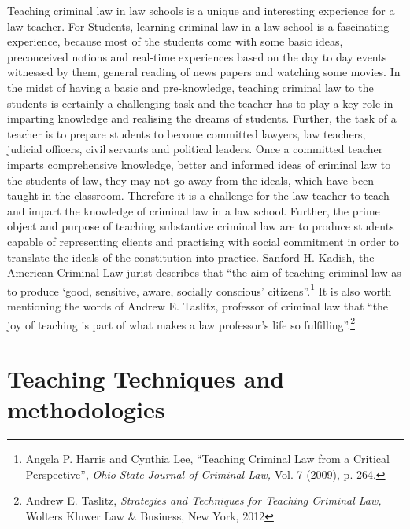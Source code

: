 \begin{multicols}{2}
\vspace{-.2cm}

\noi
Teaching criminal law in law schools is a unique and interesting experience for a law
teacher. For Students, learning criminal law in a law school is a fascinating
experience, because most of the students come with some basic ideas, preconceived
notions and real-time experiences based on the day to day events witnessed by them,
general reading of news papers and watching some movies. In the midst of having a
basic and pre-knowledge, teaching criminal law to the students is certainly a
challenging task and the teacher has to play a key role in imparting knowledge and
realising the dreams of students. Further, the task of a teacher is to prepare students to
become committed lawyers, law teachers, judicial officers, civil servants and political
leaders. Once a committed teacher imparts comprehensive knowledge, better and
informed ideas of criminal law to the students of law, they may not go away from the
ideals, which have been taught in the classroom. Therefore it is a challenge for the
law teacher to teach and impart the knowledge of criminal law in a law school.
Further, the prime object and purpose of teaching substantive criminal law are to
produce students capable of representing clients and practising with social
commitment in order to translate the ideals of the constitution into practice. Sanford
H. Kadish, the American Criminal Law jurist describes that “the aim of teaching criminal law as to produce ‘good, sensitive, aware, socially conscious’ citizens”.\footnote{Angela P. Harris and Cynthia Lee, “Teaching Criminal Law from a Critical Perspective”, \textit{Ohio State Journal of Criminal Law,} Vol. 7 (2009), p. 264.} It is also worth mentioning the words of Andrew E. Taslitz, professor of criminal law that “the joy of teaching is part of what makes a law professor’s life so fulfilling”.\footnote{Andrew E. Taslitz, \textit{Strategies and Techniques for Teaching Criminal Law,} Wolters Kluwer Law \& Business, New York, 2012}

\vspace{-.3cm}

\section{Teaching Techniques and methodologies}\label{section-2}

\vspace{-.2cm}


\end{multicols}
